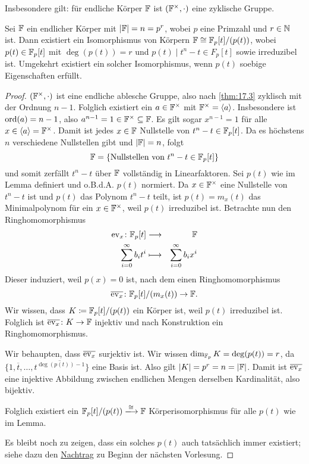 \documentclass[12pt,a4paper]{scrartcl}
\begin{document}
\begin{bem} Insbesondere gilt: für endliche Körper $\mathbb F$ ist $(\mathbb F^{\times}, \cdot)$ eine zyklische Gruppe.
\end{bem}
\begin{lem}\label{lem:17.4}
	Sei $\mathbb F$ ein endlicher Körper mit $|\mathbb F| = n = p^r$, wobei $p$ eine Primzahl und $r\in\mathbb N$ ist. Dann existiert ein Isomorphismus von Körpern $\mathbb F\cong \mathbb F_p[t]/(p(t))$, wobei $p(t)\in \mathbb F_p[t]$ mit $\deg(p(t)) = r$ und $p(t)\mid t^n-t\in F_p[t]$ sowie irreduzibel ist. Umgekehrt existiert ein solcher Isomorphismus, wenn $p(t)$ soebige Eigenschaften erfüllt.
\end{lem}
\begin{proof}
	$(\mathbb F^{\times}, \cdot)$ ist eine endliche ablesche Gruppe, also nach \cref{thm:17.3} zyklisch mit der Ordnung $n-1$. Folglich existiert ein $a\in\mathbb F^{\times}$ mit $\mathbb F^{\times} = \langle a\rangle$. Insbesondere ist $\operatorname{ord}(a) = n-1$, also $a^{n-1} = 1\in\mathbb F^{\times}\subseteq \mathbb F$. Es gilt sogar $x^{n-1} = 1$ für alle $x\in\langle a\rangle = \mathbb F^{\times}$. Damit ist jedes $x\in \mathbb F$ Nullstelle von $t^n-t\in\mathbb F_p[t]$. Da es höchstens $n$ verschiedene Nullstellen gibt und $|\mathbb F| = n $, folgt 
	\[\mathbb F= \{\text{Nullstellen von $t^n-t\in\mathbb F_p[t]$}\}\]
	und somit zerfällt $t^n-t$ über $\mathbb F$ vollständig in Linearfaktoren. Sei $p(t)$ wie im Lemma definiert und o.B.d.A. $p(t)$ normiert. Da $x\in\mathbb F^{\times}$ eine Nullstelle von $t^{n}-t$ ist und $p(t)$ das Polynom $t^{n}-t$ teilt, ist $p(t) = m_x(t)$ das Minimalpolynom für ein $x\in\mathbb F^{\times}$, weil $p(t)$ irreduzibel ist. Betrachte nun den Ringhomomorphismus
	\begin{eqnarray*}
		\operatorname{ev}_x\colon \mathbb F_p[t] &\longrightarrow & \mathbb F\\
		\sum_{i = 0}^{\infty}b_it^i & \longmapsto & \sum_{i = 0}^{\infty}b_ix^i
	\end{eqnarray*}
	Dieser induziert, weil $p(x) = 0$ ist, nach dem  einen Ringhomomorphismus
	\[\overline{\operatorname{ev}_x}\colon \mathbb F_p[t]/(m_x(t)) \to \mathbb F.\]
	Wir wissen, dass $K \coloneqq\mathbb F_p[t]/(p(t))$ ein Körper ist, weil $p(t)$ irreduzibel ist. Folglich ist $\overline{\operatorname{ev}_x}\colon K\to \mathbb F$ injektiv und nach Konstruktion ein Ringhomomorphismus.
	
	Wir behaupten, dass $\overline{\operatorname{ev}_x}$ surjektiv ist. Wir wissen $\dim_{\mathbb F_p}K = \deg(p(t)) = r$, da $\{1,\overline{t},\dots, \overline{t^{\deg(p(t))-1}}\}$ eine Basis ist. Also gilt $|K| = p^r = n = |\mathbb F|$. Damit ist $\overline{\operatorname{ev}_x}$ eine injektive Abbildung zwischen endlichen Mengen derselben Kardinalität, also bijektiv.
	
	Folglich existiert ein $\IF_p[t]/(p(t))\xlongrightarrow{\cong}\IF$ Körperisomorphismus für alle $p(t)$ wie im Lemma.
	
	Es bleibt noch zu zeigen, dass ein solches $p(t)$ auch tatsächlich immer existiert; siehe dazu den \hyperref[nachtrag zu 17.4]{Nachtrag} zu Beginn der nächsten Vorlesung.
\end{proof}
\end{document}
